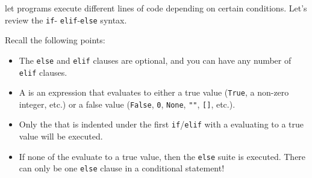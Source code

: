  let programs execute different lines of code
depending on certain conditions. Let's review the \texttt{if}-
\texttt{elif}-\texttt{else} syntax.

Recall the following points:
\begin{itemize}
    \item The \texttt{else} and \texttt{elif} clauses are optional, and you can have any number of \texttt{elif} clauses.
    \item A  is an expression that evaluates to either a true value (\texttt{True}, a non-zero integer, etc.) or a false value (\texttt{False}, \texttt{0}, \texttt{None}, \texttt{""}, \texttt{[]}, etc.).
    \item Only the  that is indented under the first
        \texttt{if}/\texttt{elif} with a 
        evaluating to a true value will be executed.
    \item If none of the  evaluate to a true
        value, then the \texttt{else} suite is executed. There can only be one
        \texttt{else} clause in a conditional statement!
\end{itemize}
